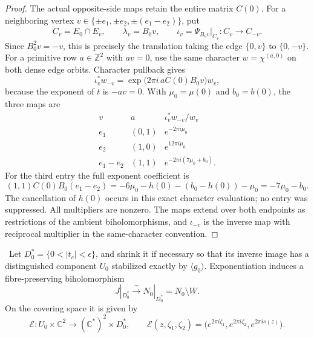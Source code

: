 \begin{proof}
The actual opposite-side maps retain the entire matrix \(C(0)\).
For a neighboring vertex
\(v\in\{\pm e_1,\pm e_2,\pm(e_1-e_2)\}\), put
\[
 C_v=E_0\cap E_v,\qquad
 \bar\lambda_v=B_0v,\qquad
 \iota_v=\Psi_{B_0v}|_{C_v}:C_v\longrightarrow C_{-v}.
\]
Since \(B_0^2v=-v\), this is precisely the translation taking the edge
\(\{0,v\}\) to \(\{0,-v\}\).  For a primitive row \(a\in\mathbb Z^2\)
with \(av=0\), use the same character \(w=\chi^{(a,0)}\) on both
dense edge orbits.  Character pullback gives
\begin{equation}
 \iota_v^*w_{-v}=\exp\bigl(2\pi i\,aC(0)B_0v\bigr)w_v,
 \label{wb:eq:cusp-exact-opposite-edge}
\end{equation}
because the exponent of \(t\) is \(-av=0\).  With
\(\mu_0=\mu(0)\) and \(b_0=b(0)\), the three maps are
\[
\begin{array}{c|c|c}
 v&a&\iota_v^*w_{-v}/w_v\\\hline
 e_1&(0,1)&e^{-2\pi i\mu_0}\\
 e_2&(1,0)&e^{12\pi i\mu_0}\\
 e_1-e_2&(1,1)&e^{-2\pi i(7\mu_0+b_0)}.
\end{array}
\]
For the third entry the full exponent coefficient is
\[
 (1,1)C(0)B_0(e_1-e_2)
 =-6\mu_0-h(0)-(b_0-h(0))-\mu_0=-7\mu_0-b_0.
\]
The cancellation of \(h(0)\) occurs in this exact character evaluation;
no entry was suppressed.  All multipliers are nonzero.  The maps extend
over both endpoints as restrictions of the ambient biholomorphisms, and
\(\iota_{-v}\) is the inverse map with reciprocal multiplier in the
same-character convention.
\end{proof}

\begin{proposition}
\label{wb:prop:candidate-cusp-overlap}
\ Let \(D_0^*=\{0<|t_c|<\epsilon\}\), and shrink it if necessary
so that its inverse image has a distinguished component \(U_0\) stabilized
exactly by \(\langle g_0\rangle\).  Exponentiation induces a
fibre-preserving biholomorphism
\[
 J|_{D_0^*}\xrightarrow{\ \sim\ }
 N_0|_{D_0^*}=N_0\setminus W.
\tag{2.8i}
\]
On the covering space it is given by
\[
 \mathcal E:U_0\times\mathbb C^2\longrightarrow
             (\mathbb C^*)^2\times D_0^*,
 \qquad
 \mathcal E(z,\zeta_1,\zeta_2)
 =\bigl(e^{2\pi i\zeta_1},e^{2\pi i\zeta_2},e^{2\pi is(z)}\bigr).
\tag{2.8ii}
\]
\end{proposition}

